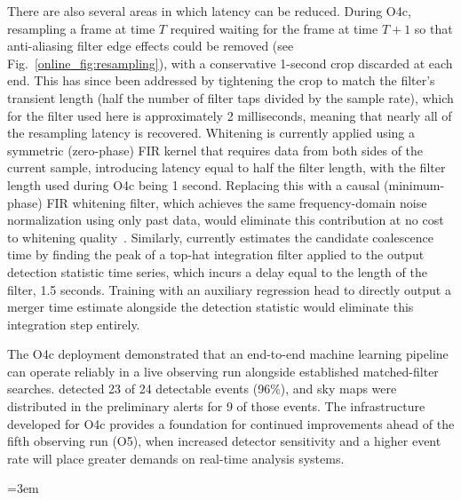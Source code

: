 \begin{refsection}
There are also several areas in which latency can be reduced.
During O4c, resampling a frame at time $T$ required waiting for the frame at time $T+1$ so that anti-aliasing filter edge effects could be removed (see Fig.~\ref{online_fig:resampling}), with a conservative 1-second crop discarded at each end.
This has since been addressed by tightening the crop to match the filter's transient length (half the number of filter taps divided by the sample rate), which for the filter used here is approximately 2 milliseconds, meaning that nearly all of the resampling latency is recovered.
Whitening is currently applied using a symmetric (zero-phase) FIR kernel that requires data from both sides of the current sample, introducing latency equal to half the filter length, with the filter length used during O4c being 1 second.
Replacing this with a causal (minimum-phase) FIR whitening filter, which achieves the same frequency-domain noise normalization using only past data, would eliminate this contribution at no cost to whitening quality~\cite{kennington2026gaugetheoreticsignalprocessing}.
Similarly, \aframe currently estimates the candidate coalescence time by finding the peak of a top-hat integration filter applied to the output detection statistic time series, which incurs a delay equal to the length of the filter, 1.5 seconds.
Training \aframe with an auxiliary regression head to directly output a merger time estimate alongside the detection statistic would eliminate this integration step entirely.

The O4c deployment demonstrated that an end-to-end machine learning pipeline can operate reliably in a live observing run alongside established matched-filter searches.
\aframe detected 23 of 24 detectable events (96\%), and \amplfi sky maps were distributed in the preliminary alerts for 9 of those events.
The infrastructure developed for O4c provides a foundation for continued improvements ahead of the fifth observing run (O5), when increased detector sensitivity and a higher event rate will place greater demands on real-time analysis systems.

\singlespacing
\begingroup
\emergencystretch=3em
\printbibliography[title=References,heading=subbibintoc]
\endgroup
\end{refsection}